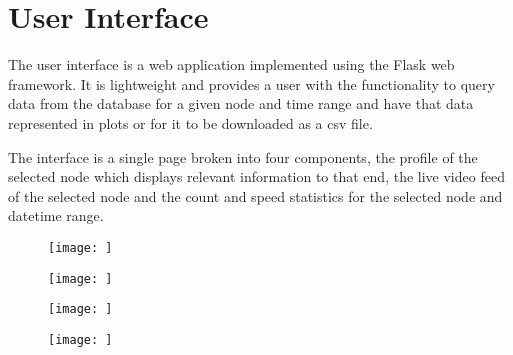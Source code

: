 \section{User Interface}

The user interface is a web application implemented using the Flask web framework. It is lightweight and provides a user with the functionality to query data from the database for a given node and time range and have that data represented in plots or for it to be downloaded as a csv file. 

The interface is a single page broken into four components, the profile of the selected node which displays relevant information to that end, the live video feed of the selected node and the count and speed statistics for the selected node and datetime range.


\begin{figure}[H]
  \centering
  \centering\texttt{[image: ]}
  \caption{}
  \label{fig:profile}
\end{figure}

\begin{figure}[H]
    \centering
    \centering\texttt{[image: ]}
    \caption{}
    \label{fig:feed}
  \end{figure}

  \begin{figure}[H]
    \centering
    \centering\texttt{[image: ]}
    \caption{}
    \label{fig:count}
  \end{figure}

  \begin{figure}[H]
    \centering
    \centering\texttt{[image: ]}
    \caption{}
    \label{fig:speed}
  \end{figure}
